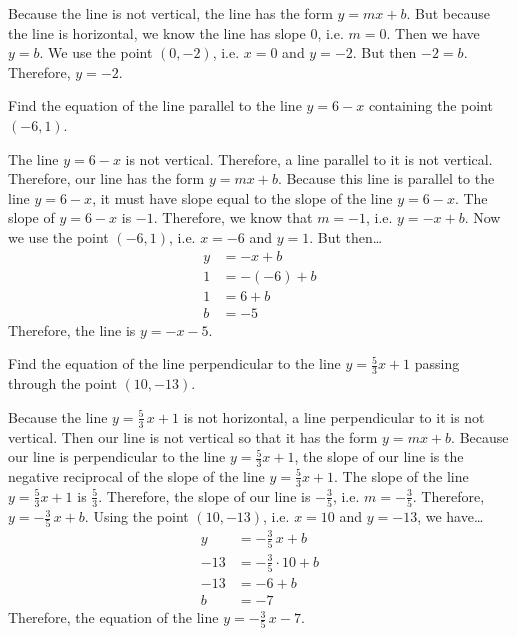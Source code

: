 \documentclass[11pt,letterpaper]{article}
\begin{document}
\sol Because the line is not vertical, the line has the form $y= mx + b$. But because the line is horizontal, we know the line has slope 0, i.e. $m= 0$. Then we have $y= b$. We use the point $(0, -2)$, i.e. $x= 0$ and $y= -2$. But then $-2= b$. Therefore, $y= -2$. 





\newpage





 Find the equation of the line parallel to the line $y= 6 - x$ containing the point $(-6, 1)$. \pspace

\sol The line $y= 6 - x$ is not vertical. Therefore, a line parallel to it is not vertical. Therefore, our line has the form $y= mx + b$. Because this line is parallel to the line $y= 6 - x$, it must have slope equal to the slope of the line $y= 6 - x$. The slope of $y= 6 - x$ is $-1$. Therefore, we know that $m= -1$, i.e. $y= -x + b$. Now we use the point $(-6, 1)$, i.e. $x= -6$ and $y= 1$. But then\dots
	\[
	\begin{aligned}
	y&= -x + b \\
	1&= -(-6) + b \\
	1&= 6 + b \\
	b&= -5 
	\end{aligned}
	\]
Therefore, the line is $y= -x - 5$. 





\newpage





 Find the equation of the line perpendicular to the line $y= \frac{5}{3} x + 1$ passing through the point $(10, -13)$. \pspace

\sol Because the line $y= \frac{5}{3}\,x + 1$ is not horizontal, a line perpendicular to it is not vertical. Then our line is not vertical so that it has the form $y= mx + b$. Because our line is perpendicular to the line $y= \frac{5}{3} x + 1$, the slope of our line is the negative reciprocal of the slope of the line $y= \frac{5}{3} x + 1$. The slope of the line $y= \frac{5}{3} x + 1$ is $\frac{5}{3}$. Therefore, the slope of our line is $-\frac{3}{5}$, i.e. $m= -\frac{3}{5}$. Therefore, $y= -\frac{3}{5}\,x + b$. Using the point $(10, -13)$, i.e. $x= 10$ and $y= -13$, we have\dots
	\[
	\begin{aligned}
	y&= -\frac{3}{5}\,x + b \\
	-13&= -\frac{3}{5} \cdot 10 + b \\
	-13&= -6 + b \\
	b&= -7
	\end{aligned}
	\]
Therefore, the equation of the line $y= -\frac{3}{5}\,x - 7$. 
\end{document}
